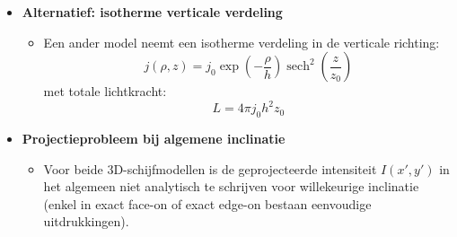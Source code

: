 \documentclass[10pt,a4paper]{article}
\renewenvironment{equation}{\begin{equation*}}{\end{equation*}}
\begin{document}
\begin{itemize}
  \item \textbf{Alternatief: isotherme verticale verdeling}
  \begin{itemize}
    \item Een ander model neemt een isotherme verdeling in de verticale richting:
    \begin{equation}
      j(\rho,z)=j_0\exp\!\left(-\frac{\rho}{h}\right)\operatorname{sech}^2\!\left(\frac{z}{z_0}\right)
      \tag{2.60}
    \end{equation}
    met totale lichtkracht:
    \begin{equation}
      L = 4\pi j_0 h^2 z_0
      \tag{2.61}
    \end{equation}
  \end{itemize}

  \item \textbf{Projectieprobleem bij algemene inclinatie}
  \begin{itemize}
    \item Voor beide 3D-schijfmodellen is de geprojecteerde intensiteit $I(x',y')$ in het algemeen niet analytisch te schrijven voor willekeurige inclinatie (enkel in exact face-on of exact edge-on bestaan eenvoudige uitdrukkingen).
  \end{itemize}


\end{itemize}
\end{document}
